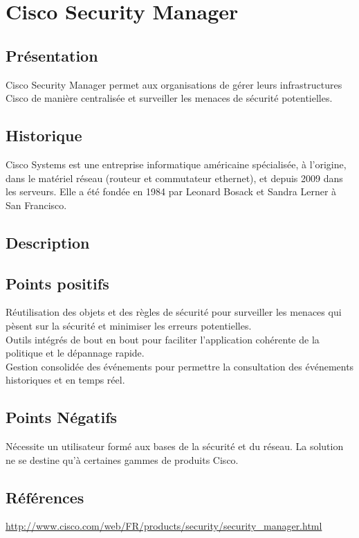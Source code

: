 \section{Cisco Security Manager}
\thispagestyle{plain}
\subsection{Présentation}
Cisco Security Manager permet aux organisations de gérer leurs infrastructures Cisco de manière centralisée et surveiller les menaces de sécurité potentielles.

\subsection{Historique}
Cisco Systems est une entreprise informatique américaine spécialisée, à l’origine, dans le matériel réseau (routeur et commutateur ethernet), et depuis 2009 dans les serveurs. Elle a été fondée en 1984 par Leonard Bosack et Sandra Lerner à San Francisco.

\subsection{Description}

\subsection{Points positifs}
Réutilisation des objets et des règles de sécurité pour surveiller les menaces qui pèsent sur la sécurité et minimiser les erreurs potentielles.\\
Outils intégrés de bout en bout pour faciliter l'application cohérente de la politique et le dépannage rapide.\\
Gestion consolidée des événements pour permettre la consultation des événements historiques et en temps réel.\\

\subsection{Points Négatifs}
Nécessite un utilisateur formé aux bases de la sécurité et du réseau.
La solution ne se destine qu’à certaines gammes de produits Cisco.

\subsection{Références}
\small
\noindent
\url{http://www.cisco.com/web/FR/products/security/security_manager.html}
\normalsize